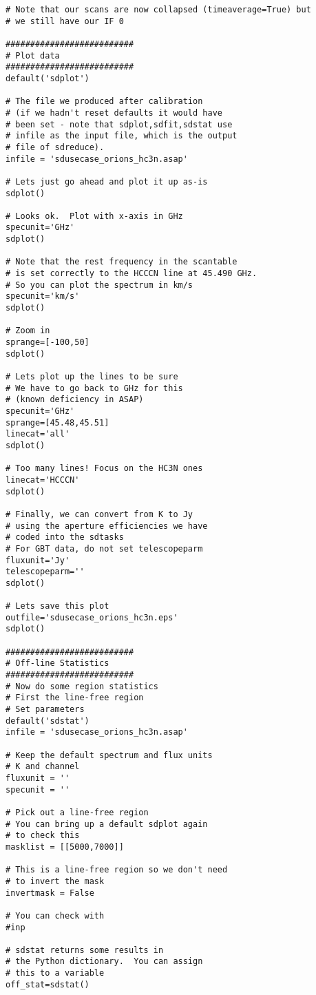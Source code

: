 \normalsize
\begin{verbatim}
# Note that our scans are now collapsed (timeaverage=True) but 
# we still have our IF 0

##########################
# Plot data
##########################
default('sdplot')

# The file we produced after calibration
# (if we hadn't reset defaults it would have
# been set - note that sdplot,sdfit,sdstat use
# infile as the input file, which is the output
# file of sdreduce).
infile = 'sdusecase_orions_hc3n.asap'

# Lets just go ahead and plot it up as-is
sdplot()

# Looks ok.  Plot with x-axis in GHz
specunit='GHz'
sdplot()

# Note that the rest frequency in the scantable
# is set correctly to the HCCCN line at 45.490 GHz.
# So you can plot the spectrum in km/s
specunit='km/s'
sdplot()

# Zoom in
sprange=[-100,50]
sdplot()

# Lets plot up the lines to be sure
# We have to go back to GHz for this
# (known deficiency in ASAP)
specunit='GHz'
sprange=[45.48,45.51]
linecat='all'
sdplot()

# Too many lines! Focus on the HC3N ones
linecat='HCCCN'
sdplot()

# Finally, we can convert from K to Jy
# using the aperture efficiencies we have
# coded into the sdtasks
# For GBT data, do not set telescopeparm
fluxunit='Jy'
telescopeparm=''
sdplot()

# Lets save this plot
outfile='sdusecase_orions_hc3n.eps'
sdplot()

##########################
# Off-line Statistics
##########################
# Now do some region statistics
# First the line-free region
# Set parameters
default('sdstat')
infile = 'sdusecase_orions_hc3n.asap'

# Keep the default spectrum and flux units
# K and channel
fluxunit = ''
specunit = ''

# Pick out a line-free region
# You can bring up a default sdplot again
# to check this
masklist = [[5000,7000]]

# This is a line-free region so we don't need
# to invert the mask
invertmask = False

# You can check with
#inp

# sdstat returns some results in
# the Python dictionary.  You can assign
# this to a variable
off_stat=sdstat()


\end{verbatim}
